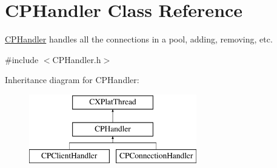 \hypertarget{class_c_p_handler}{\section{\-C\-P\-Handler \-Class \-Reference}
\label{class_c_p_handler}
}


\hyperlink{class_c_p_handler}{\-C\-P\-Handler} handles all the connections in a pool, adding, removing, etc.  




{\ttfamily \#include $<$\-C\-P\-Handler.\-h$>$}

\-Inheritance diagram for \-C\-P\-Handler\-:\begin{figure}[H]
\begin{center}
\leavevmode
\includegraphics[height=3.000000cm]{class_c_p_handler}
\end{center}
\end{figure}
